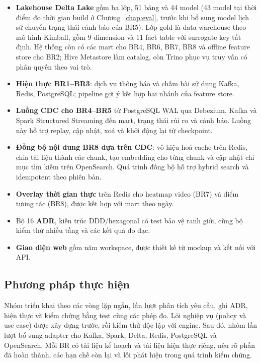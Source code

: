 \begin{itemize}
  \item \textbf{Lakehouse Delta Lake} gồm ba lớp, 51 bảng và 44 model (43 model tại thời điểm đo thời gian build ở Chương~\ref{chap:eval}, trước khi bổ sung model lịch sử chuyển trạng thái cảnh báo của BR5). Lớp gold là data warehouse theo mô hình Kimball, gồm 9 dimension và 11 fact table với surrogate key tất định. Hệ thống còn có các mart cho BR4, BR6, BR7, BR8 và offline feature store cho BR2; Hive Metastore làm catalog, còn Trino phục vụ truy vấn có phân quyền theo vai trò.
  \item \textbf{Hiện thực BR1--BR3}: dịch vụ thông báo và chấm bài sử dụng Kafka, Redis, PostgreSQL; pipeline gợi ý kết hợp hai nhánh của feature store.
  \item \textbf{Luồng CDC cho BR4--BR5} từ PostgreSQL WAL qua Debezium, Kafka và Spark Structured Streaming đến mart, trạng thái rủi ro và cảnh báo. Luồng này hỗ trợ replay, cập nhật, xoá và khởi động lại từ checkpoint.
  \item \textbf{Đồng bộ nội dung BR8 dựa trên CDC}: vô hiệu hoá cache trên Redis, chia tài liệu thành các chunk, tạo embedding cho từng chunk và cập nhật chỉ mục tìm kiếm trên OpenSearch. Quá trình đồng bộ hỗ trợ hybrid search và idempotent theo phiên bản.
  \item \textbf{Overlay thời gian thực} trên Redis cho heatmap video (BR7) và điểm tương tác (BR8), được kết hợp với mart theo ngày.
  \item Bộ 16 \textbf{ADR}, kiến trúc DDD/hexagonal có test bảo vệ ranh giới, cùng bộ kiểm thử nhiều tầng và các kết quả đo đạc.
  \item \textbf{Giao diện web} gồm năm workspace, được thiết kế từ mockup và kết nối với API.
\end{itemize}

\subsection{Phương pháp thực hiện}

Nhóm triển khai theo các vòng lặp ngắn, lần lượt phân tích yêu cầu, ghi ADR, hiện thực và kiểm chứng bằng test cùng các phép đo. Lõi nghiệp vụ (policy và use case) được xây dựng trước, rồi kiểm thử độc lập với engine. Sau đó, nhóm lần lượt bổ sung adapter cho Kafka, Spark, Delta, Redis, PostgreSQL và OpenSearch. Mỗi BR có tài liệu kế hoạch và tài liệu hiện thực riêng, nêu rõ phần đã hoàn thành, các hạn chế còn lại và lỗi phát hiện trong quá trình kiểm chứng.

